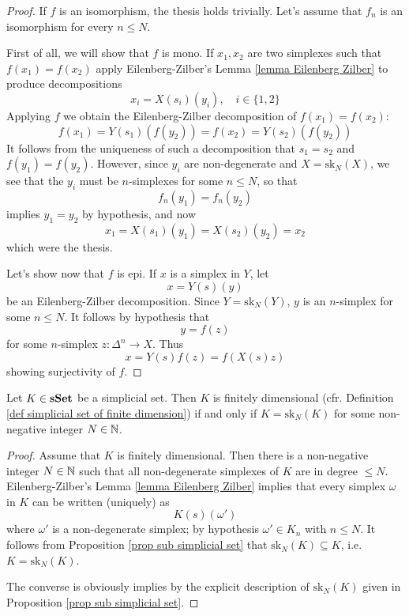\begin{proof}
If $f$ is an isomorphism, the thesis holds trivially. Let's assume that $f_n$ is an isomorphism for every $n \le N$.

First of all, we will show that $f$ is mono. If $x_1,x_2$ are two simplexes such that $f(x_1) = f(x_2)$ apply Eilenberg-Zilber's Lemma \ref{lemma Eilenberg Zilber} to produce decompositions
\[
x_i = X(s_i)(y_i), \quad i \in \{ 1,2 \}
\]
Applying $f$ we obtain the Eilenberg-Zilber decomposition of $f(x_1) = f(x_2)$:
\[
f(x_1) = Y(s_1)(f(y_2)) = f(x_2) = Y(s_2)(f(y_2))
\]
It follows from the uniqueness of such a decomposition that $s_1 = s_2$ and $f(y_1) = f(y_2)$. However, since $y_i$ are non-degenerate and $X = \mathrm{sk}_N(X)$, we see that the $y_i$ must be $n$-simplexes for some $n \le N$, so that
\[
f_n(y_1) = f_n(y_2)
\]
implies $y_1 = y_2$ by hypothesis, and now
\[
x_1 = X(s_1)(y_1) = X(s_2)(y_2) = x_2
\]
which were the thesis.

Let's show now that $f$ is epi. If $x$ is a simplex in $Y$, let
\[
x = Y(s)(y)
\]
be an Eilenberg-Zilber decomposition. Since $Y = \mathrm{sk}_N(Y)$, $y$ is an $n$-simplex for some $n \le N$. It follows by hypothesis that
\[
y = f(z)
\]
for some $n$-simplex $z \colon \Delta^n \to X$. Thus
\[
x = Y(s)f(z) = f(X(s)z)
\]
showing surjectivity of $f$.
\end{proof}

\begin{prop}
Let $K \in \mathbf{sSet}$ be a simplicial set. Then $K$ is finitely dimensional (cfr. Definition \ref{def simplicial set of finite dimension}) if and only if $K = \mathrm{sk}_N(K)$ for some non-negative integer $N \in \mathbb{N}$.
\end{prop}

\begin{proof}
Assume that $K$ is finitely dimensional. Then there is a non-negative integer $N \in \mathbb{N}$ such that all non-degenerate simplexes of $K$ are in degree $\le N$. Eilenberg-Zilber's Lemma \ref{lemma Eilenberg Zilber} implies that every simplex $\omega$ in $K$ can be written (uniquely) as
\[
K(s)(\omega')
\]
where $\omega'$ is a non-degenerate simplex; by hypothesis $\omega' \in K_n$ with $n \le N$. It follows from Proposition \ref{prop sub simplicial set} that $\mathrm{sk}_N(K) \subseteq K$, i.e. $K = \mathrm{sk}_N(K)$.

The converse is obviously implies by the explicit description of $\mathrm{sk}_N(K)$ given in Proposition \ref{prop sub simplicial set}.
\end{proof}

